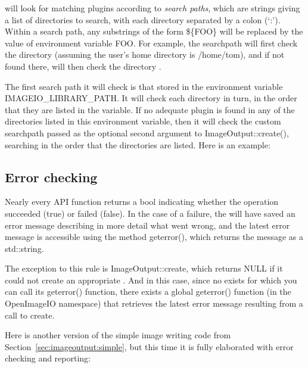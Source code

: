 \product will look for matching plugins according to
\emph{search paths}, which are strings giving a list of directories to
search, with each directory separated by a colon (`{\cf :}').  Within
a search path, any
substrings of the form {\cf \$\{FOO\}} will be replaced
by the value of environment variable {\cf FOO}.  For
example, the searchpath 
will first check the directory  (assuming the
user's home directory is {\cf /home/tom}), and if not
found there, will then check the directory .

The first search path it will check is that stored in the environment
variable {\cf IMAGEIO_LIBRARY_PATH}.  It will check each directory in
turn, in the order that they are listed in the variable.  If no adequate
plugin is found in any of the directories listed in this environment
variable, then it will check the custom searchpath passed as the
optional second argument to {\cf ImageOutput::create()}, searching in
the order that the directories are listed.  Here is an example:



\subsection{Error checking}
\label{sec:imageoutput:errors}

Nearly every \ImageOutput API function returns a {\cf bool} indicating
whether the operation succeeded ({\cf true}) or failed ({\cf false}).
In the case of a failure, the \ImageOutput will have saved an error
message describing in more detail what went wrong, and the latest
error message is accessible using the \ImageOutput method 
{\cf geterror()}, which returns the message as a {\cf std::string}.

The exception to this rule is {\cf ImageOutput::create}, which returns
{\cf NULL} if it could not create an appropriate \ImageOutput.  And in
this case, since no \ImageOutput exists for which you can call its {\cf
  geterror()} function, there exists a global {\cf geterror()}
function (in the {\cf OpenImageIO} namespace) that retrieves the latest
error message resulting from a call to {\cf create}.

Here is another version of the simple image writing code from
Section~\ref{sec:imageoutput:simple}, but this time it is fully 
elaborated with error checking and reporting:

